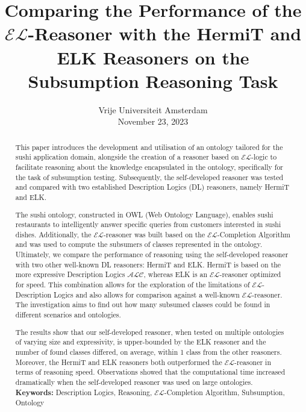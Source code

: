 \documentclass[a4paper]{article}
\title{Comparing the Performance of the $\mathcal{EL}$-Reasoner with the HermiT and ELK Reasoners on the Subsumption Reasoning Task}
\date{
	Vrije Universiteit Amsterdam\\%
	November 23, 2023
}
\theoremstyle{plain}
\theoremstyle{definition}
\begin{document}
	\maketitle

	\begin{abstract}
    This paper introduces the development and utilisation of an ontology tailored for the sushi application domain, alongside the creation of a reasoner based on $\mathcal{EL}$-logic to facilitate reasoning about the knowledge encapsulated in the ontology, specifically for the task of subsumption testing. Subsequently, the self-developed reasoner was tested and compared with two established Description Logics (DL) reasoners, namely HermiT and ELK.
    
    The sushi ontology, constructed in OWL (Web Ontology Language), enables sushi restaurants to intelligently answer specific queries from customers interested in sushi dishes. Additionally, the $\mathcal{EL}$-reasoner was built based on the $\mathcal{EL}$-Completion Algorithm and was used to compute the subsumers of classes represented in the ontology. Ultimately, we compare the performance of reasoning using the self-developed reasoner with two other well-known DL reasoners: HermiT and ELK. HermiT is based on the more expressive Description Logics $\mathcal{ALC}$, whereas ELK is an $\mathcal{EL}$-reasoner optimized for speed. This combination allows for the exploration of the limitations of $\mathcal{EL}$-Description Logics and also allows for comparison against a well-known $\mathcal{EL}$-reasoner. The investigation aims to find out how many subsumed classes could be found in different scenarios and ontologies. 
    
    The results show that our self-developed reasoner, when tested on multiple ontologies of varying size and expressivity, is upper-bounded by the ELK reasoner and the number of found classes differed, on average, within 1 class from the other reasoners. Moreover, the HermiT and ELK reasoners both outperformed the $\mathcal{EL}$-reasoner in terms of reasoning speed. Observations showed that the computational time increased dramatically when the self-developed reasoner was used on large ontologies.\\

		\noindent\textbf{Keywords:} Description Logics, Reasoning, $\mathcal{EL}$-Completion Algorithm, Subsumption, Ontology
	\end{abstract}
\end{document}
